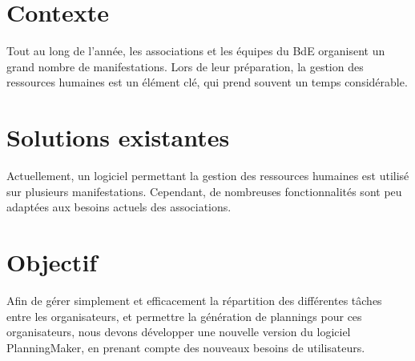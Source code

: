 \section{Contexte}
Tout au long de l'année, les associations et les équipes du BdE organisent un grand nombre de manifestations. Lors de leur préparation, la gestion des ressources humaines est un
 élément clé, qui prend souvent un temps considérable. 


\section{Solutions existantes}
Actuellement, un logiciel permettant la gestion des ressources humaines est utilisé sur plusieurs manifestations. Cependant, de nombreuses fonctionnalités sont peu adaptées aux besoins actuels des associations.


\section{Objectif}
Afin de gérer simplement et efficacement la répartition des différentes tâches entre les organisateurs, et permettre la génération de plannings pour ces organisateurs, nous devons
développer une nouvelle version du logiciel PlanningMaker, en prenant compte des nouveaux besoins de utilisateurs.


